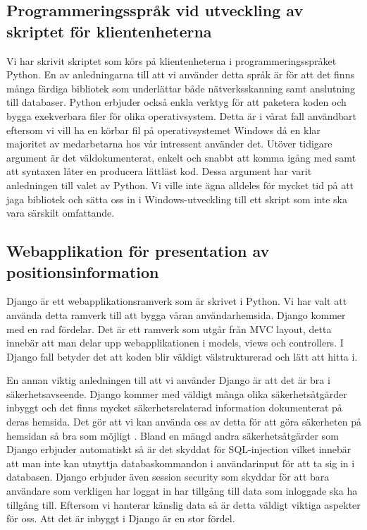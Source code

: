 \documentclass[swedish, a4paper,12pt]{article}
\begin{document}
\subsection{Programmeringsspråk vid utveckling av skriptet för klientenheterna}
Vi har skrivit skriptet som körs på klientenheterna i programmeringsspråket Python.
En av anledningarna till att vi använder detta språk är för att det finns många färdiga bibliotek som underlättar både nätverksskanning samt anslutning till databaser. Python erbjuder också enkla verktyg för att paketera koden och bygga exekverbara filer för olika operativsystem. Detta är i vårat fall användbart eftersom vi vill ha en körbar fil på operativsystemet Windows då en klar majoritet av medarbetarna hos vår intressent använder det. Utöver tidigare argument är det väldokumenterat, enkelt och snabbt att komma igång med samt att syntaxen låter en producera lättläst kod. Dessa argument har varit anledningen till valet av Python. Vi ville inte ägna alldeles för mycket tid på att jaga bibliotek och sätta oss in i Windows-utveckling till ett skript som inte ska vara särskilt omfattande.

\subsection{Webapplikation för presentation av positionsinformation}\label{django}
Django är ett webapplikationsramverk som är skrivet i Python. Vi har valt att använda detta ramverk till att bygga våran användarhemsida. Django kommer med en rad fördelar. Det är ett ramverk som utgår från MVC layout\cite{djangoMVC},
detta innebär att man delar upp webapplikationen i models, views och controllers. I Django fall betyder det att koden blir väldigt välstrukturerad och lätt att hitta i.

En annan viktig anledningen till att vi använder Django är att det är bra i säkerhetsavseende. Django kommer med väldigt många olika säkerhetsåtgärder inbyggt och det finns mycket säkerhetsrelaterad information dokumenterat på deras hemsida. Det gör att vi kan använda oss av detta för att göra säkerheten på hemsidan så bra som möjligt \cite{securityInDjango}. Bland en mängd andra säkerhetsåtgärder som Django erbjuder automatiskt så är det skyddat för SQL-injection \cite{securityInDjango}
vilket innebär att man inte kan utnyttja databaskommandon i användarinput för att ta sig in i databasen. Django erbjuder även session security \cite{securityInDjango} som skyddar för att bara användare som verkligen har loggat in har tillgång till data som inloggade ska ha tillgång till.
Eftersom vi hanterar känslig data så är detta väldigt viktiga aspekter för oss. Att det är inbyggt i Django är en stor fördel.
\end{document}
